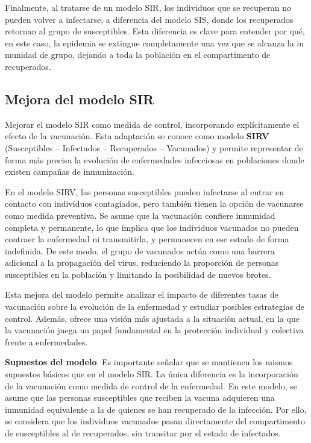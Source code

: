 Finalmente, al tratarse de un modelo SIR, los individuos que se recuperan no pueden volver a infectarse, a diferencia del modelo SIS, donde los recuperados retornan al grupo de susceptibles. Esta diferencia es clave para entender por qué, en este caso, la epidemia se extingue completamente una vez que se alcanza la in munidad de grupo, dejando a toda la población en el compartimento de recuperados.

\subsection{Mejora del modelo SIR}
Mejorar el modelo SIR como medida de control, incorporando explícitamente el efecto de la vacunación. Esta adaptación se conoce como modelo \textbf{SIRV} (Susceptibles – Infectados – Recuperados – Vacunados) y permite representar de forma más precisa la evolución de enfermedades infecciosas en poblaciones donde existen campañas de inmunización.

En el modelo SIRV, las personas susceptibles pueden infectarse al entrar en contacto con individuos contagiados, pero también tienen la opción de vacunarse como medida preventiva. Se asume que la vacunación confiere inmunidad completa y permanente, lo que implica que los individuos vacunados no pueden contraer la enfermedad ni transmitirla, y permanecen en ese estado de forma indefinida. De este modo, el grupo de vacunados actúa como una barrera adicional a la propagación del virus, reduciendo la proporción de personas susceptibles en la población y limitando la posibilidad de nuevos brotes.

Esta mejora del modelo permite analizar el impacto de diferentes tasas de vacunación sobre la evolución de la enfermedad y estudiar posibles estrategias de control. Además, ofrece una visión más ajustada a la situación actual, en la que la vacunación juega un papel fundamental en la protección individual y colectiva frente a enfermedades.

\textbf{Supuestos del modelo}. Es importante señalar que se mantienen los mismos supuestos básicos que en el modelo SIR. La única diferencia es la incorporación de la vacunación como medida de control de la enfermedad. En este modelo, se asume que las personas susceptibles que reciben la vacuna adquieren una inmunidad equivalente a la de quienes se han recuperado de la infección. Por ello, se considera que los individuos vacunados pasan directamente del compartimento de susceptibles al de recuperados, sin transitar por el estado de infectados.

